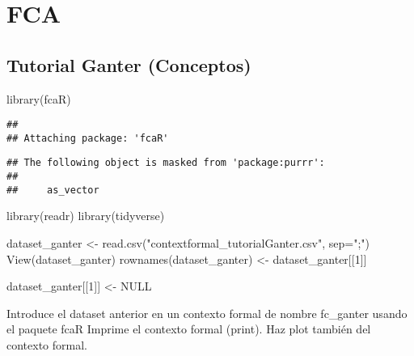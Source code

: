 \documentclass[
]{book}
\newenvironment{Shaded}{\begin{snugshade}}{\end{snugshade}}
\newcommand{\AttributeTok}[1]{\textcolor[rgb]{0.77,0.63,0.00}{#1}}
\newcommand{\ConstantTok}[1]{\textcolor[rgb]{0.00,0.00,0.00}{#1}}
\newcommand{\DecValTok}[1]{\textcolor[rgb]{0.00,0.00,0.81}{#1}}
\newcommand{\FunctionTok}[1]{\textcolor[rgb]{0.00,0.00,0.00}{#1}}
\newcommand{\NormalTok}[1]{#1}
\newcommand{\OtherTok}[1]{\textcolor[rgb]{0.56,0.35,0.01}{#1}}
\newcommand{\SpecialCharTok}[1]{\textcolor[rgb]{0.00,0.00,0.00}{#1}}
\newcommand{\StringTok}[1]{\textcolor[rgb]{0.31,0.60,0.02}{#1}}
\begin{document}
\hypertarget{fca}{%
\chapter{FCA}\label{fca}}

\hypertarget{tutorial-ganter-conceptos}{%
\section{Tutorial Ganter (Conceptos)}\label{tutorial-ganter-conceptos}}

\begin{Shaded}
\begin{Highlighting}[]
\FunctionTok{library}\NormalTok{(}\StringTok{\textquotesingle{}fcaR\textquotesingle{}}\NormalTok{)}
\end{Highlighting}
\end{Shaded}

\begin{verbatim}
## 
## Attaching package: 'fcaR'
\end{verbatim}

\begin{verbatim}
## The following object is masked from 'package:purrr':
## 
##     as_vector
\end{verbatim}

\begin{Shaded}
\begin{Highlighting}[]
\FunctionTok{library}\NormalTok{(readr)}
\FunctionTok{library}\NormalTok{(tidyverse)}

\NormalTok{dataset\_ganter }\OtherTok{\textless{}{-}} \FunctionTok{read.csv}\NormalTok{(}\StringTok{"contextformal\_tutorialGanter.csv"}\NormalTok{, }\AttributeTok{sep=}\StringTok{";"}\NormalTok{)}
\FunctionTok{View}\NormalTok{(dataset\_ganter)}
\FunctionTok{rownames}\NormalTok{(dataset\_ganter) }\OtherTok{\textless{}{-}}\NormalTok{ dataset\_ganter[[}\DecValTok{1}\NormalTok{]]}

\NormalTok{dataset\_ganter[[}\DecValTok{1}\NormalTok{]] }\OtherTok{\textless{}{-}} \ConstantTok{NULL}
\end{Highlighting}
\end{Shaded}

Introduce el dataset anterior en un contexto formal de nombre fc\_ganter usando el paquete fcaR Imprime el contexto formal (print). Haz plot también del contexto formal.

\begin{Shaded}
\end{Shaded}
\end{document}
